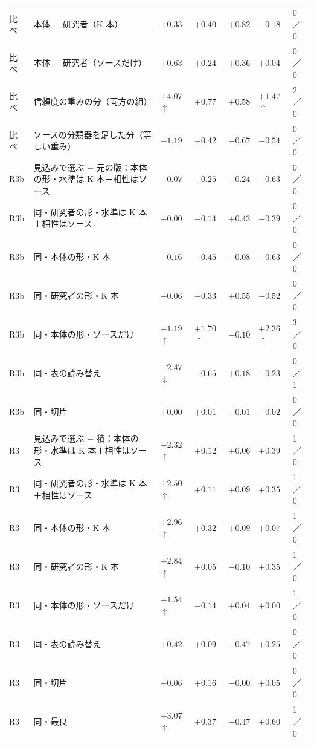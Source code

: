 \begin{longtable}{>{\raggedright}p{0.75cm}>{\raggedright}p{5.6cm}>{\raggedright}p{2.05cm}>{\raggedright}p{2.05cm}>{\raggedright}p{2.05cm}>{\raggedright}p{2.05cm}p{0.75cm}}
比べ & 本体 $-$ 研究者（K 本） & $+0.33$ & $+0.40$ & $+0.82$ & $-0.18$ & 0／0 \\
比べ & 本体 $-$ 研究者（ソースだけ） & $+0.63$ & $+0.24$ & $+0.36$ & $+0.04$ & 0／0 \\
比べ & 信頼度の重みの分（両方の組） & $+4.07$$\uparrow$ & $+0.77$ & $+0.58$ & $+1.47$$\uparrow$ & 2／0 \\
比べ & ソースの分類器を足した分（等しい重み） & $-1.19$ & $-0.42$ & $-0.67$ & $-0.54$ & 0／0 \\
R3b & 見込みで選ぶ $-$ 元の版：本体の形・水準は K 本＋相性はソース & $-0.07$ & $-0.25$ & $-0.24$ & $-0.63$ & 0／0 \\
R3b & 同・研究者の形・水準は K 本＋相性はソース & $+0.00$ & $-0.14$ & $+0.43$ & $-0.39$ & 0／0 \\
R3b & 同・本体の形・K 本 & $-0.16$ & $-0.45$ & $-0.08$ & $-0.63$ & 0／0 \\
R3b & 同・研究者の形・K 本 & $+0.06$ & $-0.33$ & $+0.55$ & $-0.52$ & 0／0 \\
R3b & 同・本体の形・ソースだけ & $+1.19$$\uparrow$ & $+1.70$$\uparrow$ & $-0.10$ & $+2.36$$\uparrow$ & 3／0 \\
R3b & 同・表の読み替え & $-2.47$$\downarrow$ & $-0.65$ & $+0.18$ & $-0.23$ & 0／1 \\
R3b & 同・切片 & $+0.00$ & $+0.01$ & $-0.01$ & $-0.02$ & 0／0 \\
R3 & 見込みで選ぶ $-$ 積：本体の形・水準は K 本＋相性はソース & $+2.32$$\uparrow$ & $+0.12$ & $+0.06$ & $+0.39$ & 1／0 \\
R3 & 同・研究者の形・水準は K 本＋相性はソース & $+2.50$$\uparrow$ & $+0.11$ & $+0.09$ & $+0.35$ & 1／0 \\
R3 & 同・本体の形・K 本 & $+2.96$$\uparrow$ & $+0.32$ & $+0.09$ & $+0.07$ & 1／0 \\
R3 & 同・研究者の形・K 本 & $+2.84$$\uparrow$ & $+0.05$ & $-0.10$ & $+0.35$ & 1／0 \\
R3 & 同・本体の形・ソースだけ & $+1.54$$\uparrow$ & $-0.14$ & $+0.04$ & $+0.00$ & 1／0 \\
R3 & 同・表の読み替え & $+0.42$ & $+0.09$ & $-0.47$ & $+0.25$ & 0／0 \\
R3 & 同・切片 & $+0.06$ & $+0.16$ & $-0.00$ & $+0.05$ & 0／0 \\
R3 & 同・最良 & $+3.07$$\uparrow$ & $+0.37$ & $-0.47$ & $+0.60$ & 1／0 \\
\end{longtable}
